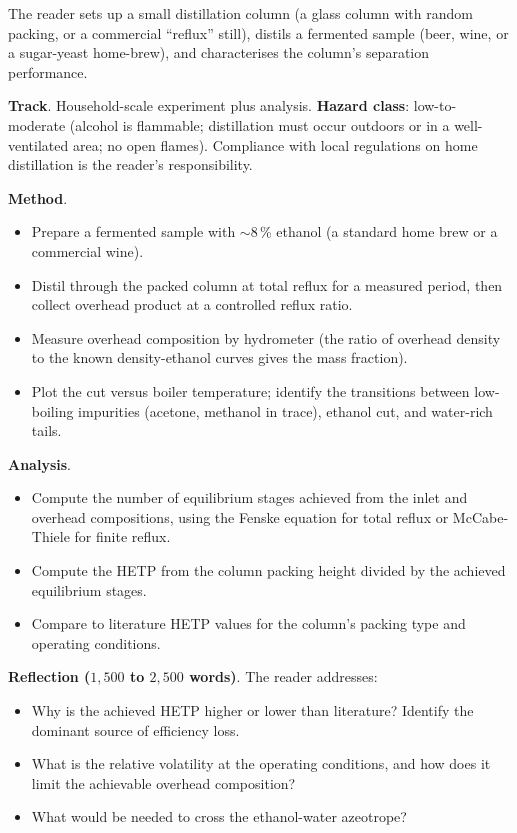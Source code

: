 \begin{project}
The reader sets up a small distillation column (a glass column with
random packing, or a commercial ``reflux'' still), distils a
fermented sample (beer, wine, or a sugar-yeast home-brew), and
characterises the column's separation performance.

\textbf{Track}. Household-scale experiment plus analysis.
\textbf{Hazard class}: low-to-moderate (alcohol is flammable;
distillation must occur outdoors or in a well-ventilated area; no
open flames). Compliance with local regulations on home distillation
is the reader's responsibility.

\textbf{Method}.

\begin{itemize}[leftmargin=*]
  \item Prepare a fermented sample with $\sim 8\,\%$ ethanol (a
    standard home brew or a commercial wine).
  \item Distil through the packed column at total reflux for a
    measured period, then collect overhead product at a controlled
    reflux ratio.
  \item Measure overhead composition by hydrometer (the ratio of
    overhead density to the known density-ethanol curves gives the
    mass fraction).
  \item Plot the cut versus boiler temperature; identify the
    transitions between low-boiling impurities (acetone, methanol
    in trace), ethanol cut, and water-rich tails.
\end{itemize}

\textbf{Analysis}.

\begin{itemize}[leftmargin=*]
  \item Compute the number of equilibrium stages achieved from the
    inlet and overhead compositions, using the Fenske equation for
    total reflux or McCabe-Thiele for finite reflux.
  \item Compute the HETP from the column packing height divided by
    the achieved equilibrium stages.
  \item Compare to literature HETP values for the column's packing
    type and operating conditions.
\end{itemize}

\textbf{Reflection ($1{,}500$ to $2{,}500$ words)}. The reader
addresses:

\begin{itemize}[leftmargin=*]
  \item Why is the achieved HETP higher or lower than literature?
    Identify the dominant source of efficiency loss.
  \item What is the relative volatility at the operating conditions,
    and how does it limit the achievable overhead composition?
  \item What would be needed to cross the ethanol-water azeotrope?
\end{itemize}


\end{project}
